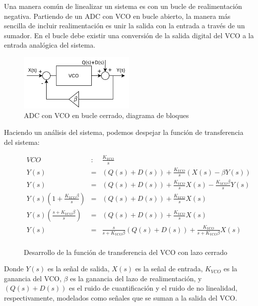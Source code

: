 \documentclass[12pt]{report} %
\begin{document}
	Una manera común de linealizar un sistema es con un bucle de realimentación negativa. Partiendo de un ADC con VCO en bucle abierto, la manera más sencilla de incluir realimentación es unir la salida con la entrada a través de un sumador. En el bucle debe existir una conversión de la salida digital del VCO a la entrada analógica del sistema.

	\begin{figure}[H]
		\includegraphics[width=0.5\textwidth]{vco-diagram-closed-loop-with-D.png}
		\caption[ADC con VCO en bucle abierto, diagrama de bloques]{ADC con VCO en bucle cerrado, diagrama de bloques}
		\label{fig:vco-diagram-closed-loop-with-D.png}
	\end{figure}
	
	Haciendo un análisis del sistema, podemos despejar la función de transferencia del sistema:
	
	\begin{figure}[H]
		\caption{Desarrollo de la función de transferencia del VCO con lazo cerrado}
		\label{vco-closed-loop-s}
		\begin{equation}
		\begin{array}{lcl}
		VCO & : & \frac{K_{VCO}}{s} \\
		Y(s) &=& ( Q(s) + D(s) ) + \frac{K_{VCO}}{s}(X(s) - \beta Y(s) ) \\
		Y(s) &=& ( Q(s) + D(s) ) + \frac{K_{VCO}}{s}X(s) - \frac{K_{VCO} \beta}{s}Y(s) \\
		Y(s) (1 + \frac{K_{VCO}\beta}{s}) &=& ( Q(s) + D(s) ) + \frac{K_{VCO}}{s}X(s) \\
		Y(s) (\frac{s + K_{VCO}\beta}{s}) &=& ( Q(s) + D(s) ) + \frac{K_{VCO}}{s}X(s) \\
		Y(s) &=& \frac{s}{s + K_{VCO}\beta}( Q(s) + D(s) ) + \frac{K_{VCO}}{s + K_{VCO}\beta}X(s) \\
		\end{array}
		\end{equation}
	\end{figure}
	
	Donde $Y(s)$ es la señal de salida, $X(s)$ es la señal de entrada, $K_{VCO}$ es la ganancia del VCO, $\beta$ es la ganancia del lazo de realimentación, y $( Q(s) + D(s) )$ es el ruido de cuantificación y el ruido de no linealidad, respectivamente, modelados como señales que se suman a la salida del VCO.
	
\end{document}
